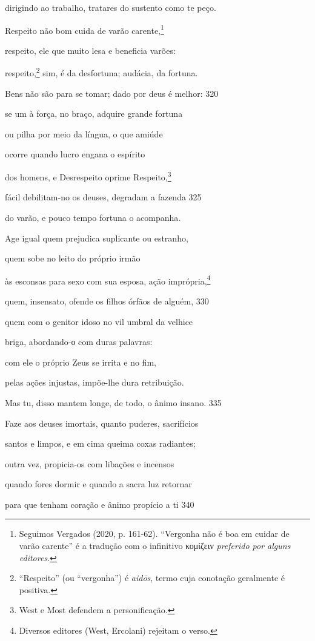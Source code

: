 dirigindo ao trabalho, tratares do sustento como te peço.

Respeito não bom cuida de varão carente,\footnote{Seguimos Vergados (2020, p. 161-62). ``Vergonha não é boa em cuidar
de varão carente'' é a tradução com o infinitivo κομίζειν
\emph{preferido por alguns editores}.}

respeito, ele que muito lesa e beneficia varões:

respeito,\footnote{``Respeito'' (ou ``vergonha'') é \emph{aidōs}, termo cuja
conotação geralmente é positiva.} sim, é da desfortuna; audácia, da fortuna.

Bens não são para se tomar; dado por deus é melhor: \num{320}

se um à força, no braço, adquire grande fortuna

ou pilha por meio da língua, o que amiúde

ocorre quando lucro engana o espírito

dos homens, e Desrespeito oprime Respeito,\footnote{West e Most defendem a personificação.}

fácil debilitam-no os deuses, degradam a fazenda \num{325}

do varão, e pouco tempo fortuna o acompanha.

Age igual quem prejudica suplicante ou estranho,

quem sobe no leito do próprio irmão

às esconsas para sexo com sua esposa, ação imprópria,\footnote{Diversos editores (West, Ercolani) rejeitam o verso.}

quem, insensato, ofende os filhos órfãos de alguém, \num{330}

quem com o genitor idoso no vil umbral da velhice

briga, abordando-ο com duras palavras:

com ele o próprio Zeus se irrita e no fim,

pelas ações injustas, impõe-lhe dura retribuição.

Mas tu, disso mantem longe, de todo, o ânimo insano. \num{335}

Faze aos deuses imortais, quanto puderes, sacrifícios

santos e limpos, e em cima queima coxas radiantes;

outra vez, propicia-os com libações e incensos

quando fores dormir e quando a sacra luz retornar

para que tenham coração e ânimo propício a ti \num{340}


